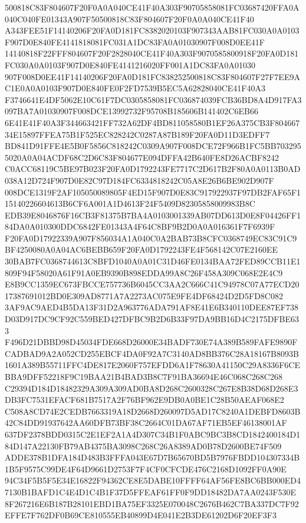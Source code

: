 \documentclass[UTF8,fontset=fandol,zihao=-4,a4paper]{ctexart}
\begin{document}
{{500818C83F804607F20F0A0A040CE41F40A303F90705858081FC03687420FFA0A040C040FE01343A907F50500818C83F804607F20F0A0A040CE41F40
A343FEE51F14140206F20FA0D181FC8382020103F907343AAB81FC030A0A0103F907D0E840FE4141818081FC031A1DC83FA0A01030907F008D0EE41F
14140818F22FFF804607F20F2828040CE41F40A303F9070585800918F20FA0D181FC030A0A0103F907D0E840FE4141216020FF001A1DC83FA0A01030
907F008D0EE41F14140206F20FA0D181FC838252500818C83F804607F27F7EE9AC1E0A0A0103F907D0E840FE0F2FD7539B5EC5A62828040CE41F40A3
F3746641E4DF5062E10C61F7DC0305858081FC036874039FCB36BD8A4D917FA3097BA7A01030907F008DCE13992732F95708B185606B141402C6EB66
6E41E41F40A3F344663421FF732A62DF4BD811058580B1EF26A375CB3F80466734E15897FFEA75B1F525EC828242C0287A87B189F20FA0D11D3EDFF7
BD841D91FFE4E5B0F5856C818242C0309A907F008DCE72F966B1FC5BB7032955020A0A04ACDF68C2D6C83F804677E094DFFA42B640FE8D26ACBF8242
C0ACC68119C5BE97B023F20FA0D1792243FE7717C2D617B2F80A0A0113B0AD038A12D724F907D0E82C97D184FC6334818242C05A8E26B6BE902D907F
008DCE1319F2AF105050089805F4ED15F907D0E83C917922937F97DB2FAF65F115140226604613B6CF6A001A1D4613F24F5409D82305858009983B8C
EDB39E8046876F16CB3F81375B7BA4A0103001339AB07DD613D0E8F04426FF184DA0A010300DDC6842FE01343A4F64C8BF9B2D0A0A016361F7F6939F
F20FA0D17922339A907F856034A1A040C0A2BAB73B8CFC0368749EC83C91C9BF4250080A0A04AC6BEBB659F20FA0D1792243FE4F568142C07E2160EE
30BAB7FC0368744613C8BFD1040A0A01C31D46FE0134BAA72FED89CCB11E1809F94F58020A61F91A0EB9390B898EDDA99A8C26F458A309C068E2E4C9
E8B9CC1359EC673FBCCE757736B6045CC3AA2C666C41C94978C07A77ECD2017387691012BD0E309AD8771A7A2273AC075E9FE4DF68424D2D5FD8C082
3AF9AC9AED4B5DA13F31D2A963776ADA791AF8E41E6B340110DEE87EF738D03D917DC9CF92C559BED427DFBC9B2D6B33F97DA9BB16D4C2175DFBE633
F496D21DBBD98D45034FDE668D26000E34BADF730E74A389B589FAFE9890FCADBAD9A2A052CD255EBCF4DA0F92A7C3140AD8BB376C28A18167B8093B
1601A389B55711FFC4DE817E2060F757EFDD6A1F78630A41150C29A8336F6CEBBA9DFF52218F9C19BAA21B4BAD3B8C7F91BA36694E46C068C268C268
C29394D184D18482329A309A309AD0BA8D268C2600328C267E8B38D68D268E3DB3FC7531EFACF681B7517A2F76BF962E9DB0A0BE1C28B50AEAF068E2
C508A8CD74E2CEDB7663319A18D2668D260097D5AD17C8240A1DEBFD8603B42C84DD91937642AA60DFB73BF38C2664C01DA67AF71EB5EF46138001AF
637DF2378BDD0315C2E1EF2A1A4D307C34B1F0ABC9BC3B8CD1842400184D184D147A22130FB79AB4375BA3098C268C26A8389AD0B78D2600BE74F509
ADDE378B1DFA184D483B3FFFA043E67D7B65670BD5B7976FBDD104307334B1B5F9575C99DE4F64D9661D2753F7F4CF0CFCDE476C2168D1092FF0A90E
94C34F5B5F5E34E16822F94362CE8E5DABE10FFFF64AF56FE8BC6BB000ED47130B1BAFD1C4E4D1C4B1F37D5FFEAF61FF0F9DD18482DA7AA0243F530E
8F267216E6B187B28101EBD1BA75EF3325E070048C2676B462C7BA337DC7F92EFFE7F762DF0B69CE810555EB40899D4E041E2B3DE61202D6F20EF3F3
}}
\end{document}
